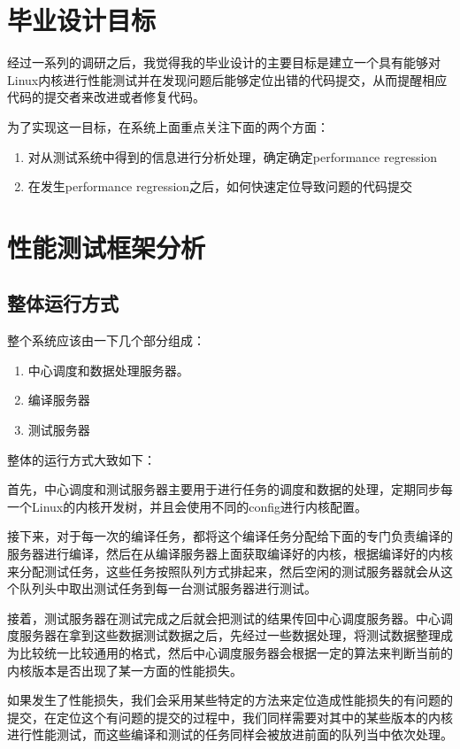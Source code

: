 \documentclass[CJK,12pt]{article}
\begin{document}
\section{毕业设计目标}
经过一系列的调研之后，我觉得我的毕业设计的主要目标是建立一个具有能够对Linux内核进行性能测试并在发现问题后能够定位出错的代码提交，从而提醒相应代码的提交者来改进或者修复代码。

为了实现这一目标，在系统上面重点关注下面的两个方面：
\begin{enumerate}
\item 对从测试系统中得到的信息进行分析处理，确定确定performance regression
\item 在发生performance regression之后，如何快速定位导致问题的代码提交
\end{enumerate}

\section{性能测试框架分析}

\subsection{整体运行方式}
整个系统应该由一下几个部分组成：
\begin{enumerate}
\item 中心调度和数据处理服务器。
\item 编译服务器
\item 测试服务器
\end{enumerate}

整体的运行方式大致如下：

首先，中心调度和测试服务器主要用于进行任务的调度和数据的处理，定期同步每一个Linux的内核开发树，并且会使用不同的config进行内核配置。

接下来，对于每一次的编译任务，都将这个编译任务分配给下面的专门负责编译的服务器进行编译，然后在从编译服务器上面获取编译好的内核，根据编译好的内核来分配测试任务，这些任务按照队列方式排起来，然后空闲的测试服务器就会从这个队列头中取出测试任务到每一台测试服务器进行测试。

接着，测试服务器在测试完成之后就会把测试的结果传回中心调度服务器。中心调度服务器在拿到这些数据测试数据之后，先经过一些数据处理，将测试数据整理成为比较统一比较通用的格式，然后中心调度服务器会根据一定的算法来判断当前的内核版本是否出现了某一方面的性能损失。

如果发生了性能损失，我们会采用某些特定的方法来定位造成性能损失的有问题的提交，在定位这个有问题的提交的过程中，我们同样需要对其中的某些版本的内核进行性能测试，而这些编译和测试的任务同样会被放进前面的队列当中依次处理。
\end{document}
